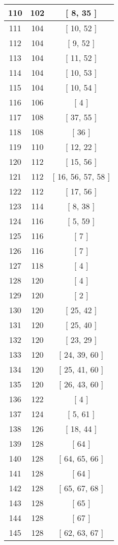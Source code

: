 \begin{center}
\begin{longtable}[H]{|| c c c ||}
\hline
110 & 102 & [ 8, 35 ] \\ 
\hline
111 & 104 & [ 10, 52 ] \\ 
\hline
112 & 104 & [ 9, 52 ] \\ 
\hline
113 & 104 & [ 11, 52 ] \\ 
\hline
114 & 104 & [ 10, 53 ] \\ 
\hline
115 & 104 & [ 10, 54 ] \\ 
\hline
116 & 106 & [ 4 ] \\ 
\hline
117 & 108 & [ 37, 55 ] \\ 
\hline
118 & 108 & [ 36 ] \\ 
\hline
119 & 110 & [ 12, 22 ] \\ 
\hline
120 & 112 & [ 15, 56 ] \\ 
\hline
121 & 112 & [ 16, 56, 57, 58 ] \\ 
\hline
122 & 112 & [ 17, 56 ] \\ 
\hline
123 & 114 & [ 8, 38 ] \\ 
\hline
124 & 116 & [ 5, 59 ] \\ 
\hline
125 & 116 & [ 7 ] \\ 
\hline
126 & 116 & [ 7 ] \\ 
\hline
127 & 118 & [ 4 ] \\ 
\hline
128 & 120 & [ 4 ] \\ 
\hline
129 & 120 & [ 2 ] \\ 
\hline
130 & 120 & [ 25, 42 ] \\ 
\hline
131 & 120 & [ 25, 40 ] \\ 
\hline
132 & 120 & [ 23, 29 ] \\ 
\hline
133 & 120 & [ 24, 39, 60 ] \\ 
\hline
134 & 120 & [ 25, 41, 60 ] \\ 
\hline
135 & 120 & [ 26, 43, 60 ] \\ 
\hline
136 & 122 & [ 4 ] \\ 
\hline
137 & 124 & [ 5, 61 ] \\ 
\hline
138 & 126 & [ 18, 44 ] \\ 
\hline
139 & 128 & [ 64 ] \\ 
\hline
140 & 128 & [ 64, 65, 66 ] \\ 
\hline
141 & 128 & [ 64 ] \\ 
\hline
142 & 128 & [ 65, 67, 68 ] \\ 
\hline
143 & 128 & [ 65 ] \\ 
\hline
144 & 128 & [ 67 ] \\ 
\hline
145 & 128 & [ 62, 63, 67 ] \\ 

\end{longtable}
\end{center}
